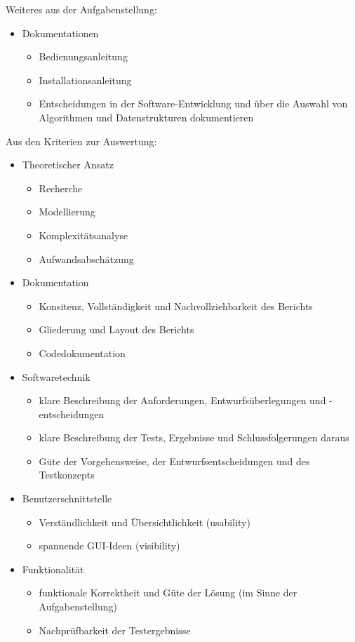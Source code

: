 Weiteres aus der Aufgabenstellung:
\begin{itemize}
 \item Dokumentationen
 \begin{itemize}
 \item Bedienungsanleitung
 \item Installationsanleitung
 \item Entscheidungen in der Software-Entwicklung und über die Auswahl von Algorithmen und Datenstrukturen dokumentieren
 \end{itemize}
\end{itemize}
Aus den Kriterien zur Auswertung:
\begin{itemize}
 \item Theoretischer Ansatz
 \begin{itemize}
 \item Recherche
 \item Modellierung
 \item Komplexitätsanalyse
 \item Aufwandsabschätzung
 \end{itemize}
 \item Dokumentation
 \begin{itemize}
 \item Konsitenz, Vollständigkeit und Nachvollziehbarkeit des Berichts
 \item Gliederung und Layout des Berichts
 \item Codedokumentation
 \end{itemize}
 \item Softwaretechnik
 \begin{itemize}
 \item klare Beschreibung der Anforderungen, Entwurfsüberlegungen und -entscheidungen
 \item klare Beschreibung der Tests, Ergebnisse und Schlussfolgerungen daraus
 \item Güte der Vorgehensweise, der Entwurfsentscheidungen und des Testkonzepts
 \end{itemize}
 \item Benutzerschnittstelle
 \begin{itemize}
 \item Verständlichkeit und Übersichtlichkeit (usability)
 \item spannende GUI-Ideen (visibility)
 \end{itemize}
 \item Funktionalität
 \begin{itemize}
 \item funktionale Korrektheit und Güte der Lösung (im Sinne der Aufgabenstellung)
 \item Nachprüfbarkeit der Testergebnisse
 \end{itemize}
\end{itemize}



